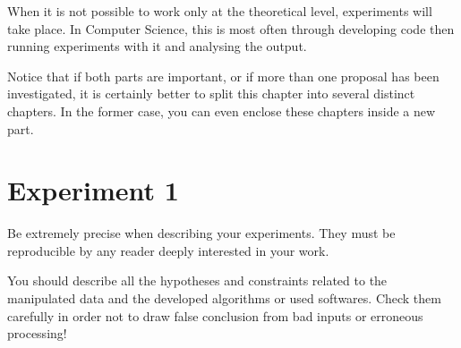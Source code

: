
When it is not possible to work only at the theoretical level, experiments will take place.  In Computer Science, this is most often through developing code then running experiments with it and analysing the output.

Notice that if both parts are important, or if more than one proposal has been investigated, it is certainly better to split this chapter into several distinct chapters.  In the former case, you can even enclose these chapters inside a new part.

\section{Experiment 1}

Be extremely precise when describing your experiments.  They must be reproducible by any reader deeply interested in your work.

You should describe all the hypotheses and constraints related to the manipulated data and the developed algorithms or used softwares.  Check them carefully in order not to draw false conclusion from bad inputs or erroneous processing!

